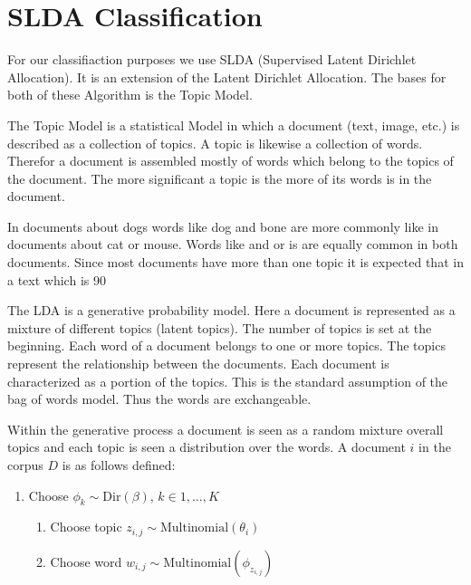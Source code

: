 \documentclass[12pt,paper=a4,nenglish]{scrreprt}
\begin{document}
\section{SLDA Classification}
\label{sec:slda_classification}

For our classifiaction purposes we use SLDA (Supervised Latent Dirichlet Allocation). 
It is an extension of the Latent Dirichlet Allocation. 
The bases for both of these Algorithm is the Topic Model.

The Topic Model is a statistical Model in which a document (text, image, etc.) is described as a collection of topics. 
A topic is likewise a collection of words. Therefor a document is assembled mostly of words which belong to the topics of the document. 
The more significant a topic is the more of its words is in the document.

In documents about dogs words like dog and bone are more commonly like in documents about cat or mouse. 
Words like and or is are equally common in both documents. 
Since most documents have more than one topic it is expected that in a text which is 90%

The LDA is a generative probability model. 
Here a document is represented as a mixture of different topics (latent topics). 
The number of topics is set at the beginning. Each word of a document belongs to one or more topics. 
The topics represent the relationship between the documents. Each document is characterized as a portion of the topics. 
This is the standard assumption of the bag of words model. 
Thus the words are exchangeable.

Within the generative process a document is seen as a random mixture overall topics and each topic is seen a distribution over the words. 
A document $ i $ in the corpus $ D $ is as follows defined:

\begin{enumerate}
\itm Choose $ \theta_i \sim \text{Dir}(\alpha) $, $ \text{Dir}(\alpha) $ Dirichlet-prior $ \alpha $
\item Choose $ \phi_k \sim \text{Dir}(\beta) $, $ k \in {1,\dots,K} $
\begin{enumerate}
\item Choose topic $ z_{i,j} \sim \text{Multinomial}(\theta_i) $
\item Choose word $ w_{i,j} \sim \text{Multinomial}(\phi_{z_{i,j}}) $
\end{enumerate}
\end{enumerate}
\end{document}
